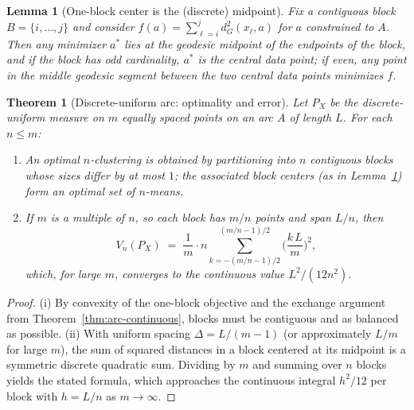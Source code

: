 \documentclass[10pt,a4paper]{amsart}
\newtheorem{lemma}{Lemma}
\newtheorem{theorem}{Theorem}
\begin{document}
\begin{lemma}[One-block center is the (discrete) midpoint]\label{lem:block-mid}
Fix a contiguous block $B=\{i,\dots,j\}$ and consider $f(a)=\sum_{\ell=i}^j d_G^2(x_\ell,a)$ for $a$ constrained to $A$. Then any minimizer $a^\ast$ lies at the \emph{geodesic midpoint} of the endpoints of the block, and if the block has odd cardinality, $a^\ast$ is the central data point; if even, any point in the middle geodesic segment between the two central data points minimizes $f$.
\end{lemma}

\begin{theorem}[Discrete-uniform arc: optimality and error]\label{thm:discrete-arc}
Let $P_X$ be the discrete-uniform measure on $m$ equally spaced points on an arc $A$ of length $L$. For each $n\le m$:
\begin{enumerate}[label=(\roman*), leftmargin=1.5em]
  \item An optimal $n$-clustering is obtained by partitioning into $n$ contiguous blocks whose sizes differ by at most $1$; the associated block centers (as in Lemma~\ref{lem:block-mid}) form an optimal set of $n$-means.
  \item If $m$ is a multiple of $n$, so each block has $m/n$ points and span $L/n$, then
  \[
  V_n(P_X)\;=\;\frac{1}{m}\cdot n\sum_{k=-(m/n-1)/2}^{(m/n-1)/2}\!\!\!\!\!\! \bigg(\frac{k\,L}{m}\bigg)^2,
  \]
  which, for large $m$, converges to the continuous value $L^2/(12n^2)$.
\end{enumerate}
\end{theorem}

\begin{proof}
(i) By convexity of the one-block objective and the exchange argument from Theorem~\ref{thm:arc-continuous}, blocks must be contiguous and as balanced as possible. (ii) With uniform spacing $\Delta=L/(m-1)$ (or approximately $L/m$ for large $m$), the sum of squared distances in a block centered at its midpoint is a symmetric discrete quadratic sum. Dividing by $m$ and summing over $n$ blocks yields the stated formula, which approaches the continuous integral $h^2/12$ per block with $h=L/n$ as $m\to\infty$.
\end{proof}
\end{document}
